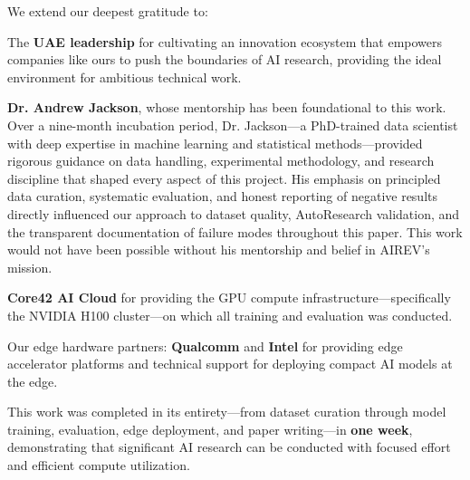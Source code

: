 \documentclass[10pt,twocolumn]{article}
\begin{document}
We extend our deepest gratitude to:

The \textbf{UAE leadership} for cultivating an innovation ecosystem that empowers companies like ours to push the boundaries of AI research, providing the ideal environment for ambitious technical work.

\textbf{Dr. Andrew Jackson}, whose mentorship has been foundational to this work. Over a nine-month incubation period, Dr. Jackson---a PhD-trained data scientist with deep expertise in machine learning and statistical methods---provided rigorous guidance on data handling, experimental methodology, and research discipline that shaped every aspect of this project. His emphasis on principled data curation, systematic evaluation, and honest reporting of negative results directly influenced our approach to dataset quality, AutoResearch validation, and the transparent documentation of failure modes throughout this paper. This work would not have been possible without his mentorship and belief in AIREV's mission.

\textbf{Core42 AI Cloud} for providing the GPU compute infrastructure---specifically the NVIDIA H100 cluster---on which all training and evaluation was conducted.

Our edge hardware partners: \textbf{Qualcomm} and \textbf{Intel} for providing edge accelerator platforms and technical support for deploying compact AI models at the edge.

This work was completed in its entirety---from dataset curation through model training, evaluation, edge deployment, and paper writing---in \textbf{one week}, demonstrating that significant AI research can be conducted with focused effort and efficient compute utilization.
\end{document}
